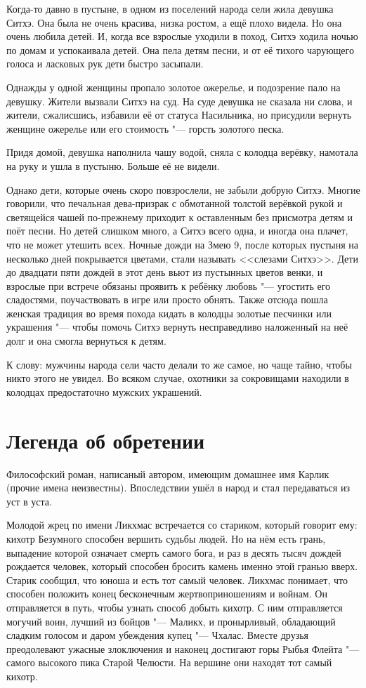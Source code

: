 Когда-то давно в пустыне, в одном из поселений народа сели жила девушка Ситхэ.
Она была не очень красива, низка ростом, а ещё плохо видела.
Но она очень любила детей.
И, когда все взрослые уходили в поход, Ситхэ ходила ночью по домам и успокаивала детей.
Она пела детям песни, и от её тихого чарующего голоса и ласковых рук дети быстро засыпали.

Однажды у одной женщины пропало золотое ожерелье, и подозрение пало на девушку.
Жители вызвали Ситхэ на суд.
На суде девушка не сказала ни слова, и жители, сжалисшись, избавили её от статуса Насильника, но присудили вернуть женщине ожерелье или его стоимость "--- горсть золотого песка.

Придя домой, девушка наполнила чашу водой, сняла с колодца верёвку, намотала на руку и ушла в пустыню.
Больше её не видели.

Однако дети, которые очень скоро повзрослели, не забыли добрую Ситхэ.
Многие говорили, что печальная дева-призрак с обмотанной толстой верёвкой рукой и светящейся чашей по-прежнему приходит к оставленным без присмотра детям и поёт песни.
Но детей слишком много, а Ситхэ всего одна, и иногда она плачет, что не может утешить всех.
Ночные дожди на Змею 9, после которых пустыня на несколько дней покрывается цветами, стали называть <<слезами Ситхэ>>.
Дети до двадцати пяти дождей в этот день вьют из пустынных цветов венки, и взрослые при встрече обязаны проявить к ребёнку любовь "--- угостить его сладостями, поучаствовать в игре или просто обнять.
Также отсюда пошла женская традиция во время похода кидать в колодцы золотые песчинки или украшения "--- чтобы помочь Ситхэ вернуть несправедливо наложенный на неё долг и она смогла вернуться к детям.

К слову: мужчины народа сели часто делали то же самое, но чаще тайно, чтобы никто этого не увидел.
Во всяком случае, охотники за сокровищами находили в колодцах предостаточно мужских украшений.

\section{Легенда об обретении}

Философский роман, написаный автором, имеющим домашнее имя Карлик (прочие имена неизвестны).
Впоследствии ушёл в народ и стал передаваться из уст в уста.

Молодой жрец по имени Ликхмас встречается со стариком, который говорит ему: кихотр Безумного способен вершить судьбы людей.
Но на нём есть грань, выпадение которой означает смерть самого бога, и раз в десять тысяч дождей рождается человек, который способен бросить камень именно этой гранью вверх.
Старик сообщил, что юноша и есть тот самый человек.
Ликхмас понимает, что способен положить конец бесконечным жертвоприношениям и войнам.
Он отправляется в путь, чтобы узнать способ добыть кихотр.
С ним отправляется могучий воин, лучший из бойцов "--- Маликх, и пронырливый, обладающий сладким голосом и даром убеждения купец "--- Чхалас.
Вместе друзья преодолевают ужасные злоключения и наконец достигают горы Рыбья Флейта "--- самого высокого пика Старой Челюсти.
На вершине они находят тот самый кихотр.

